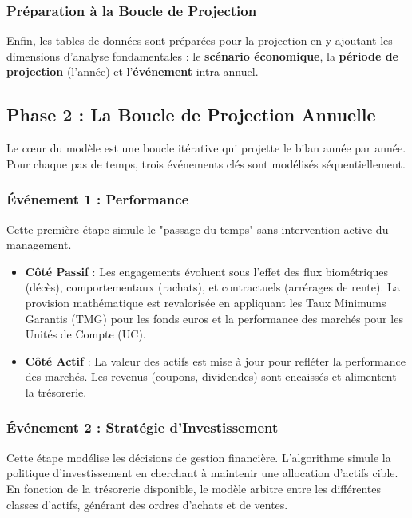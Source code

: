\begin{itemize}
\end{itemize}

\subsubsection{Préparation à la Boucle de Projection}

Enfin, les tables de données sont préparées pour la projection en y ajoutant les dimensions d'analyse fondamentales : le \textbf{scénario économique}, la \textbf{période de projection} (l'année) et l'\textbf{événement} intra-annuel.

\subsection{Phase 2 : La Boucle de Projection Annuelle}

Le cœur du modèle est une boucle itérative qui projette le bilan année par année. Pour chaque pas de temps, trois événements clés sont modélisés séquentiellement.

\subsubsection{Événement 1 : Performance}
Cette première étape simule le "passage du temps" sans intervention active du management.
\begin{itemize}
\item \textbf{Côté Passif} : Les engagements évoluent sous l'effet des flux biométriques (décès), comportementaux (rachats), et contractuels (arrérages de rente). La provision mathématique est revalorisée en appliquant les Taux Minimums Garantis (TMG) pour les fonds euros et la performance des marchés pour les Unités de Compte (UC).
\item \textbf{Côté Actif} : La valeur des actifs est mise à jour pour refléter la performance des marchés. Les revenus (coupons, dividendes) sont encaissés et alimentent la trésorerie.
\end{itemize}

\subsubsection{Événement 2 : Stratégie d'Investissement}
Cette étape modélise les décisions de gestion financière. L'algorithme simule la politique d'investissement en cherchant à maintenir une allocation d'actifs cible. En fonction de la trésorerie disponible, le modèle arbitre entre les différentes classes d'actifs, générant des ordres d'achats et de ventes.

